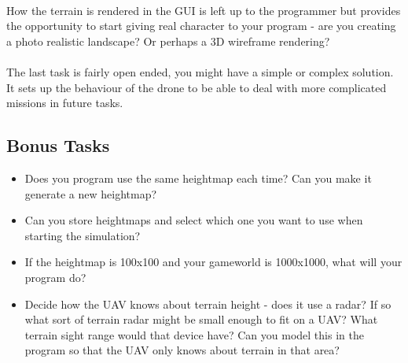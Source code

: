 \documentclass[11pt]{book}
\begin{document}
\paragraph{} How the terrain is rendered in the GUI is left up to the
programmer but provides the opportunity to start giving real character to your
program - are you creating a photo realistic landscape? Or perhaps a 3D
wireframe rendering?

\paragraph{} The last task is fairly open ended, you might have a simple or
complex solution. It sets up the behaviour of the drone to be able to deal
with more complicated missions in future tasks.

\subsection{Bonus Tasks}

\begin{itemize}
\item Does you program use the same heightmap each time? Can you make it generate a new heightmap?
\item Can you store heightmaps and select which one you want to use when starting the simulation?
\item If the heightmap is 100x100 and your gameworld is 1000x1000, what will your program do?
\item Decide how the UAV knows about terrain height - does it use a radar? If so what sort of terrain radar might be small enough to fit on a UAV? What terrain sight range would that device have? Can you model this in the program so that the UAV only knows about terrain in that area?
\end{itemize}

\clearpage
\end{document}
